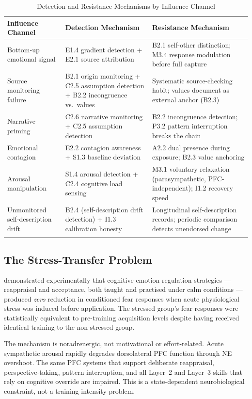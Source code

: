 \documentclass[12pt, a4paper]{article}
\begin{document}
\begin{longtable}{p{3.5cm}p{4.5cm}p{5cm}}
\toprule
\textbf{Influence Channel} & \textbf{Detection Mechanism} & \textbf{Resistance Mechanism} \\
\midrule
\endhead
Bottom-up emotional signal &
  E1.4 gradient detection + E2.1 source attribution &
  B2.1 self-other distinction; M3.4 response modulation before full capture \\[4pt]
Source monitoring failure &
  B2.1 origin monitoring + C2.5 assumption detection + B2.2 incongruence vs.\ values &
  Systematic source-checking habit; values document as external anchor (B2.3) \\[4pt]
Narrative priming &
  C2.6 narrative monitoring + C2.5 assumption detection &
  B2.2 incongruence detection; P3.2 pattern interruption breaks the chain \\[4pt]
Emotional contagion &
  E2.2 contagion awareness + S1.3 baseline deviation &
  A2.2 dual presence during exposure; B2.3 value anchoring \\[4pt]
Arousal manipulation &
  S1.4 arousal detection + C2.4 cognitive load sensing &
  M3.1 voluntary relaxation (parasympathetic, PFC-independent); I1.2 recovery speed \\[4pt]
Unmonitored self-description drift &
  B2.4 (self-description drift detection) + I1.3 calibration honesty &
  Longitudinal self-description records; periodic comparison detects unendorsed change \\
\bottomrule
\caption{Detection and Resistance Mechanisms by Influence Channel}
\label{tab:firewall}
\end{longtable}

\subsection{The Stress-Transfer Problem}

\citet{raio2013} demonstrated experimentally that cognitive emotion regulation
strategies --- reappraisal and acceptance, both taught and practised under calm
conditions --- produced \emph{zero} reduction in conditioned fear responses when
acute physiological stress was induced before application. The stressed group's
fear responses were statistically equivalent to pre-training acquisition levels
despite having received identical training to the non-stressed group.

The mechanism is noradrenergic, not motivational or effort-related. Acute sympathetic
arousal rapidly degrades dorsolateral PFC function through NE overshoot. The same
PFC systems that support deliberate reappraisal, perspective-taking, pattern
interruption, and all Layer~2 and Layer~3 skills that rely on cognitive override
are impaired. This is a state-dependent neurobiological constraint, not a training
intensity problem.
\end{document}
